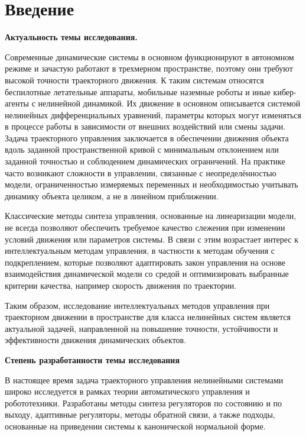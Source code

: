 


\section*{Введение}%

\textbf{Актуальность темы исследования.}

Современные динамические системы в основном функционируют в автономном режиме и зачастую работают в трехмерном пространстве, поэтому они требуют высокой точности траекторного движения.
К таким системам относятся беспилотные летательные аппараты, мобильные наземные роботы и иные кибер-агенты с нелинейной динамикой.
Их движение в основном описывается системой нелинейных дифференциальных уравнений, параметры которых могут изменяться в процессе работы в зависимости от  внешних воздействий или смены задачи.
Задача траекторного управления заключается в обеспечении движения объекта вдоль заданной пространственной кривой с минимальным отклонением или заданной точностью и соблюдением динамических ограничений.
На практике часто возникают сложности в управлении, связанные с неопределённостью модели, ограниченностью измеряемых переменных и необходимостью учитывать динамику объекта целиком, а не в линейном приближении.

Классические методы синтеза управления, основанные на линеаризации модели, не всегда позволяют обеспечить требуемое качество слежения при изменении условий движения или параметров системы.
В связи с этим возрастает интерес к интеллектуальным методам управления, в частности к методам обучения с подкреплением, которые позволяют адаптировать закон управления на основе взаимодействия динамической модели со средой и оптимизировать выбранные критерии качества, например скорость движения по траектории.

Таким образом, исследование интеллектуальных методов управления при траекторном движении в пространстве для класса нелинейных систем является актуальной задачей, направленной на повышение точности, устойчивости и эффективности движения динамических объектов.


\textbf{Степень разработанности темы исследования}

В настоящее время задача траекторного управления нелинейными системами широко исследуется в рамках теории автоматического управления и робототехники.
Разработаны методы синтеза регуляторов по состоянию и по выходу, адаптивные регуляторы, методы обратной связи, а также подходы, основанные на приведении системы к канонической нормальной форме.

